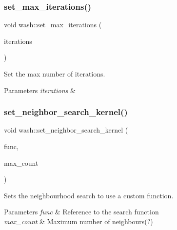 \subsubsection{\texorpdfstring{set\+\_\+max\+\_\+iterations()}{set\_max\_iterations()}}
{\footnotesize\ttfamily void wash\+::set\+\_\+max\+\_\+iterations (\begin{DoxyParamCaption}\item[{const uint64\+\_\+t}]{iterations }\end{DoxyParamCaption})}



Set the max number of iterations. 


\begin{DoxyParams}{Parameters}
{\em iterations} & \\
\hline
\end{DoxyParams}
\mbox{\label{namespacewash_a49d266f2bd4daa1a1de50dab5a4250df}} 
\subsubsection{\texorpdfstring{set\+\_\+neighbor\+\_\+search\+\_\+kernel()}{set\_neighbor\_search\_kernel()}}
{\footnotesize\ttfamily void wash\+::set\+\_\+neighbor\+\_\+search\+\_\+kernel (\begin{DoxyParamCaption}\item[{const \mbox{\hyperlink{namespacewash_a8135d763bfc59fce07b49873d8af0ed6}{Neighbors\+FuncT}}}]{func,  }\item[{const unsigned}]{max\+\_\+count }\end{DoxyParamCaption})}



Sets the neighbourhood search to use a custom function. 


\begin{DoxyParams}{Parameters}
{\em func} & Reference to the search function \\
\hline
{\em max\+\_\+count} & Maximum number of neighbours(?) \\
\hline
\end{DoxyParams}
\mbox{\label{namespacewash_ad6de17b9a27f58f6245a68ede303e84b}} 
